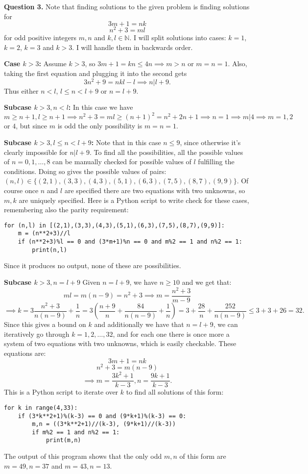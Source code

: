 \documentclass[letterpaper, reqno,11pt]{article}
\begin{document}
\medskip

{\medskip\noindent\bf Question 3.} Note that finding solutions to the given problem is finding solutions for
\[
3m+1=nk
\]
\[
n^2+3=ml
\]
for odd positive integers $m,n$ and $k,l\in\mathbb{N}$. I will split solutions into cases: $k=1$,$k=2$, $k=3$ and $k>3$. I will handle them in backwards order.

\medskip

{\noindent\bf Case $k>3$:} Assume $k>3$, so $3m+1=kn\leq 4n\implies m>n$ or $m=n=1$. Also, taking the first equation and plugging it into the second gets
\[
3n^2+9=nkl-l\implies n|l+9
.\]
Thus either $n<l$, $l\leq n<l+9$ or $n=l+9$.

{\bf Subcase $k>3,n<l$:} In this case we have $m\geq n+1,l\geq n+1\implies n^2+3=ml\geq (n+1)^2=n^2+2n+1\implies n=1\implies m|4\implies m=1,2$ or $4$, but since $m$ is odd the only possibility is $m=n=1$.

{\bf Subcase $k>3,l\leq n<l+9$:} Note that in this case $n\leq 9$, since otherwise it's clearly impossible for $n|l+9$. To find all the possibilities, all the possible values of $n=0,1,\ldots,8$ can be manually checked for possible values of $l$ fulfilling the conditions. Doing so gives the possible values of pairs: $\left( n,l \right)\in \{(2,1),(3,3),(4,3),(5,1),(6,3),(7,5),(8,7),(9,9)\}$. Of course once $n$ and $l$ are specified there are two equations with two unknowns, so $m,k$ are uniquely specified. Here is a Python script to write check for these cases, remembering also the parity requirement:
\begin{lstlisting}
for (n,l) in [(2,1),(3,3),(4,3),(5,1),(6,3),(7,5),(8,7),(9,9)]:
    m = (n**2+3)//l
    if (n**2+3)%l == 0 and (3*m+1)%n == 0 and m%2 == 1 and n%2 == 1:
        print(n,l)
\end{lstlisting}
Since it produces no output, none of these are possibilities.

{\bf Subcase $k>3,n=l+9$} Given $n=l+9$, we have $n\geq 10$ and we get that:
\[
ml=m(n-9)=n^2+3\implies m=\frac{n^2+3}{m-9}
\]
\[
\implies k=3 \frac{n^2+3}{n(n-9)}+\frac{1}{n}=3\left( \frac{n+9}{n}+\frac{84}{n(n-9)}+\frac{1}{n} \right) =3+\frac{28}{n}+ \frac{252}{n(n-9)}\leq 3+3+26=32
.\]
Since this gives a bound on $k$ and additionally we have that $n=l+9$, we can iteratively go through $k=1,2,\ldots,32$, and for each one there is once more a system of two equations with two unknowns, which is easily checkable. These equations are:
\[
3m+1=nk
\]
\[
n^2+3=m(n-9)
\]
\[
\implies m=\frac{3k^2+1}{k-3},n=\frac{9k+1}{k-3}
.\]
This is a Python script to iterate over $k$ to find all solutions of this form:
\begin{lstlisting}
for k in range(4,33):
    if (3*k**2+1)%(k-3) == 0 and (9*k+1)%(k-3) == 0:
        m,n = ((3*k**2+1)//(k-3), (9*k+1)//(k-3))
        if m%2 == 1 and n%2 == 1:
            print(m,n)
\end{lstlisting}
The output of this program shows that the only odd $m,n$ of this form are $m=49,n=37$ and $m=43,n=13$.
\end{document}
